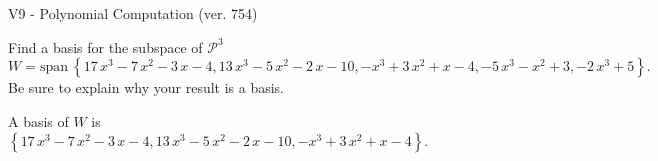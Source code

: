 \begin{exercise}
  \begin{exerciseTitle}V9 - Polynomial Computation (ver. 754)\end{exerciseTitle}
  \begin{exerciseStatement}
    Find a basis for the subspace of \(\mathcal{P}^3\) 
\[W=\mathrm{span}\ \left\{17 \, x^{3} - 7 \, x^{2} - 3 \, x - 4 , 13 \, x^{3} - 5 \, x^{2} - 2 \, x - 10 , -x^{3} + 3 \, x^{2} + x - 4 , -5 \, x^{3} - x^{2} + 3 , -2 \, x^{3} + 5\right\}.\]
 Be sure to explain why your result is a basis.


  \end{exerciseStatement}
  \begin{exerciseAnswer}
   A basis of \(W\) is  \(\left\{17 \, x^{3} - 7 \, x^{2} - 3 \, x - 4 , 13 \, x^{3} - 5 \, x^{2} - 2 \, x - 10 , -x^{3} + 3 \, x^{2} + x - 4\right\}\).
  


  \end{exerciseAnswer}
\end{exercise}
